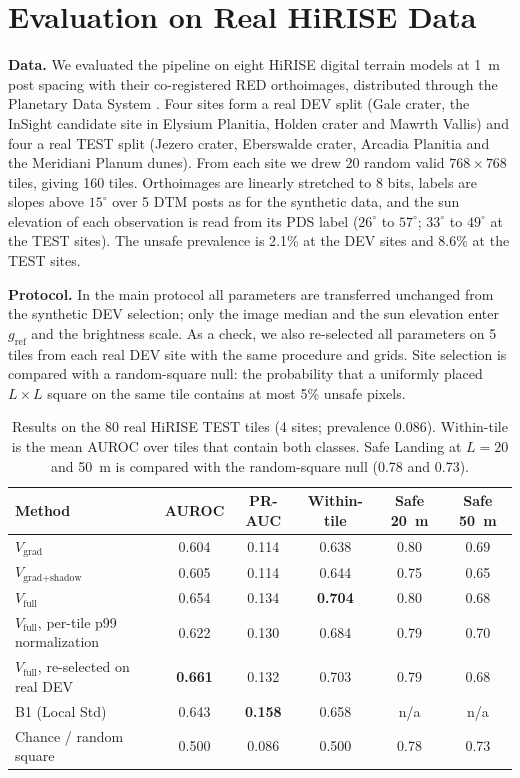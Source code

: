 \documentclass{article}
\begin{document}
\section{Evaluation on Real HiRISE Data}
\label{sec:hirise}
\textbf{Data.} We evaluated the pipeline on eight HiRISE digital terrain models at 1~m post spacing with their co-registered RED orthoimages, distributed through the Planetary Data System \cite{mcewen2007hirise}. Four sites form a real DEV split (Gale crater, the InSight candidate site in Elysium Planitia, Holden crater and Mawrth Vallis) and four a real TEST split (Jezero crater, Eberswalde crater, Arcadia Planitia and the Meridiani Planum dunes). From each site we drew 20 random valid $768 \times 768$ tiles, giving 160 tiles. Orthoimages are linearly stretched to 8 bits, labels are slopes above $15^\circ$ over 5 DTM posts as for the synthetic data, and the sun elevation of each observation is read from its PDS label ($26^\circ$ to $57^\circ$; $33^\circ$ to $49^\circ$ at the TEST sites). The unsafe prevalence is 2.1\% at the DEV sites and 8.6\% at the TEST sites.

\textbf{Protocol.} In the main protocol all parameters are transferred unchanged from the synthetic DEV selection; only the image median and the sun elevation enter $g_{\text{ref}}$ and the brightness scale. As a check, we also re-selected all parameters on 5 tiles from each real DEV site with the same procedure and grids. Site selection is compared with a random-square null: the probability that a uniformly placed $L \times L$ square on the same tile contains at most 5\% unsafe pixels.

\begin{table}[!htb]
  \caption{Results on the 80 real HiRISE TEST tiles (4 sites; prevalence 0.086). Within-tile is the mean AUROC over tiles that contain both classes. Safe Landing at $L = 20$ and 50~m is compared with the random-square null (0.78 and 0.73).}
  \label{tab:hirise}
  \centering
  \small
  \setlength{\tabcolsep}{5pt}
  \begin{tabular}{lccccc}
    \toprule
    Method & AUROC & PR-AUC & Within-tile & Safe 20~m & Safe 50~m \\
    \midrule
    $V_{\text{grad}}$ & 0.604 & 0.114 & 0.638 & 0.80 & 0.69 \\
    $V_{\text{grad+shadow}}$ & 0.605 & 0.114 & 0.644 & 0.75 & 0.65 \\
    $V_{\text{full}}$ & 0.654 & 0.134 & \textbf{0.704} & 0.80 & 0.68 \\
    $V_{\text{full}}$, per-tile p99 normalization & 0.622 & 0.130 & 0.684 & 0.79 & 0.70 \\
    $V_{\text{full}}$, re-selected on real DEV & \textbf{0.661} & 0.132 & 0.703 & 0.79 & 0.68 \\
    B1 (Local Std) & 0.643 & \textbf{0.158} & 0.658 & n/a & n/a \\
    Chance / random square & 0.500 & 0.086 & 0.500 & 0.78 & 0.73 \\
    \bottomrule
  \end{tabular}
\end{table}
\end{document}
